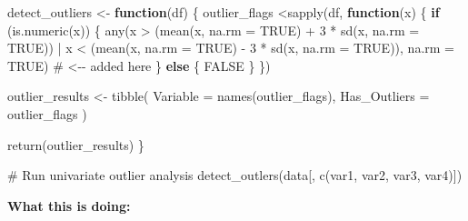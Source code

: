 \documentclass[
  letterpaper,
  DIV=11,
  numbers=noendperiod]{scrreprt}
\newenvironment{Shaded}{\begin{snugshade}}{\end{snugshade}}
\newcommand{\AttributeTok}[1]{\textcolor[rgb]{0.40,0.45,0.13}{#1}}
\newcommand{\CommentTok}[1]{\textcolor[rgb]{0.37,0.37,0.37}{#1}}
\newcommand{\ConstantTok}[1]{\textcolor[rgb]{0.56,0.35,0.01}{#1}}
\newcommand{\ControlFlowTok}[1]{\textcolor[rgb]{0.00,0.23,0.31}{\textbf{#1}}}
\newcommand{\DecValTok}[1]{\textcolor[rgb]{0.68,0.00,0.00}{#1}}
\newcommand{\FunctionTok}[1]{\textcolor[rgb]{0.28,0.35,0.67}{#1}}
\newcommand{\NormalTok}[1]{\textcolor[rgb]{0.00,0.23,0.31}{#1}}
\newcommand{\OtherTok}[1]{\textcolor[rgb]{0.00,0.23,0.31}{#1}}
\newcommand{\SpecialCharTok}[1]{\textcolor[rgb]{0.37,0.37,0.37}{#1}}
\begin{document}
\begin{Shaded}
\begin{Highlighting}[]
\NormalTok{detect\_outliers }\OtherTok{\textless{}{-}} \ControlFlowTok{function}\NormalTok{(df) \{}
\NormalTok{  outlier\_flags }\SpecialCharTok{\textless{}}\FunctionTok{sapply}\NormalTok{(df, }\ControlFlowTok{function}\NormalTok{(x) \{}
    \ControlFlowTok{if}\NormalTok{ (}\FunctionTok{is.numeric}\NormalTok{(x)) \{}
      \FunctionTok{any}\NormalTok{(x }\SpecialCharTok{\textgreater{}}\NormalTok{ (}\FunctionTok{mean}\NormalTok{(x, }\AttributeTok{na.rm =} \ConstantTok{TRUE}\NormalTok{) }\SpecialCharTok{+} \DecValTok{3} \SpecialCharTok{*} \FunctionTok{sd}\NormalTok{(x, }\AttributeTok{na.rm =} \ConstantTok{TRUE}\NormalTok{)) }\SpecialCharTok{|}
\NormalTok{            x }\SpecialCharTok{\textless{}}\NormalTok{ (}\FunctionTok{mean}\NormalTok{(x, }\AttributeTok{na.rm =} \ConstantTok{TRUE}\NormalTok{) }\SpecialCharTok{{-}} \DecValTok{3} \SpecialCharTok{*} \FunctionTok{sd}\NormalTok{(x, }\AttributeTok{na.rm =} \ConstantTok{TRUE}\NormalTok{)),}
          \AttributeTok{na.rm =} \ConstantTok{TRUE}\NormalTok{)  }\CommentTok{\# \textless{}{-}{-} added here}
\NormalTok{    \} }\ControlFlowTok{else}\NormalTok{ \{}
      \ConstantTok{FALSE}
\NormalTok{    \}}
\NormalTok{  \})}
  
\NormalTok{  outlier\_results }\OtherTok{\textless{}{-}} \FunctionTok{tibble}\NormalTok{(}
    \AttributeTok{Variable =} \FunctionTok{names}\NormalTok{(outlier\_flags),}
    \AttributeTok{Has\_Outliers =}\NormalTok{ outlier\_flags}
\NormalTok{  )}
  
  \FunctionTok{return}\NormalTok{(outlier\_results)}
\NormalTok{\}}

\CommentTok{\# Run univariate outlier analysis}
\FunctionTok{detect\_outlers}\NormalTok{(data[, }\FunctionTok{c}\NormalTok{(var1, var2, var3, var4)])}
\end{Highlighting}
\end{Shaded}

\textbf{What this is doing:}
\end{document}
